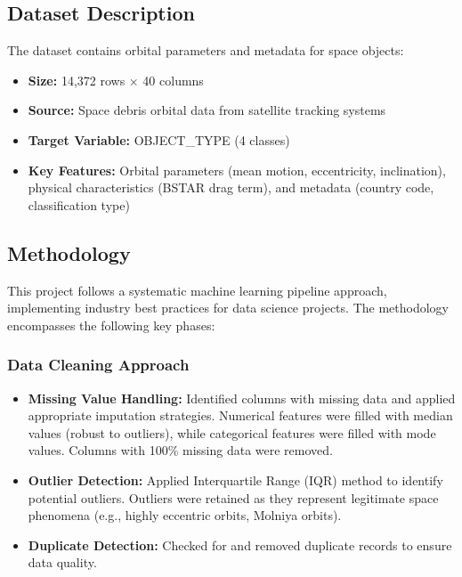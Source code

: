 \documentclass[12pt,a4paper]{article}
\begin{document}
\subsection{Dataset Description}
The dataset contains orbital parameters and metadata for space objects:
\begin{itemize}
    \item \textbf{Size:} 14,372 rows × 40 columns
    \item \textbf{Source:} Space debris orbital data from satellite tracking systems
    \item \textbf{Target Variable:} OBJECT\_TYPE (4 classes)
    \item \textbf{Key Features:} Orbital parameters (mean motion, eccentricity, inclination), physical characteristics (BSTAR drag term), and metadata (country code, classification type)
\end{itemize}

\subsection{Methodology}
This project follows a systematic machine learning pipeline approach, implementing industry best practices for data science projects. The methodology encompasses the following key phases:

\subsubsection{Data Cleaning Approach}
\begin{itemize}
    \item \textbf{Missing Value Handling:} Identified columns with missing data and applied appropriate imputation strategies. Numerical features were filled with median values (robust to outliers), while categorical features were filled with mode values. Columns with 100\% missing data were removed.
    \item \textbf{Outlier Detection:} Applied Interquartile Range (IQR) method to identify potential outliers. Outliers were retained as they represent legitimate space phenomena (e.g., highly eccentric orbits, Molniya orbits).
    \item \textbf{Duplicate Detection:} Checked for and removed duplicate records to ensure data quality.
\end{itemize}
\end{document}

